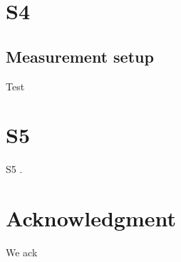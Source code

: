 \section{S4}

\subsection {Measurement setup}
Test

\section{S5}
S5 \cite{erezMTT2012}.


\section*{Acknowledgment}
We ack 


\ifCLASSOPTIONcaptionsoff
  \newpage
\fi




\vfill


